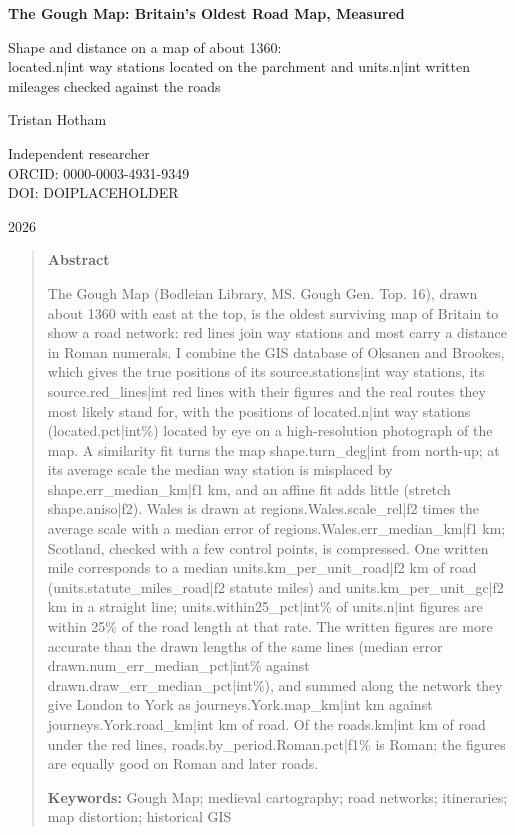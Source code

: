 \documentclass[11pt,a4paper]{article}
\begin{document}
\begin{center}
{\Large\bfseries The Gough Map: Britain's Oldest Road Map, Measured\par}
\vspace{0.4em}
{\large Shape and distance on a map of about 1360:\\{{located.n|int}} way stations located on the parchment and {{units.n|int}} written mileages checked against the roads\par}
\vspace{1.2em}
{\large Tristan Hotham\par}
\vspace{0.3em}
{\small Independent researcher\\
ORCID: 0000-0003-4931-9349\\
DOI: DOIPLACEHOLDER\par}
\vspace{0.8em}
2026
\end{center}

\begin{quote}
\small
\begin{center}\textbf{Abstract}\end{center}
The Gough Map (Bodleian Library, MS. Gough Gen. Top. 16), drawn about 1360 with east at the top, is the oldest surviving map of Britain to show a road network: red lines join way stations and most carry a distance in Roman numerals. I combine the GIS database of Oksanen and Brookes, which gives the true positions of its {{source.stations|int}} way stations, its {{source.red_lines|int}} red lines with their figures and the real routes they most likely stand for, with the positions of {{located.n|int}} way stations ({{located.pct|int}}\%) located by eye on a high-resolution photograph of the map. A similarity fit turns the map {{shape.turn_deg|int}}\textdegree{} from north-up; at its average scale the median way station is misplaced by {{shape.err_median_km|f1}} km, and an affine fit adds little (stretch {{shape.aniso|f2}}). Wales is drawn at {{regions.Wales.scale_rel|f2}} times the average scale with a median error of {{regions.Wales.err_median_km|f1}} km; Scotland, checked with a few control points, is compressed. One written mile corresponds to a median {{units.km_per_unit_road|f2}} km of road ({{units.statute_miles_road|f2}} statute miles) and {{units.km_per_unit_gc|f2}} km in a straight line; {{units.within25_pct|int}}\% of {{units.n|int}} figures are within 25\% of the road length at that rate. The written figures are more accurate than the drawn lengths of the same lines (median error {{drawn.num_err_median_pct|int}}\% against {{drawn.draw_err_median_pct|int}}\%), and summed along the network they give London to York as {{journeys.York.map_km|int}} km against {{journeys.York.road_km|int}} km of road. Of the {{roads.km|int}} km of road under the red lines, {{roads.by_period.Roman.pct|f1}}\% is Roman; the figures are equally good on Roman and later roads.

\textbf{Keywords:} Gough Map; medieval cartography; road networks; itineraries; map distortion; historical GIS
\end{quote}
\end{document}
